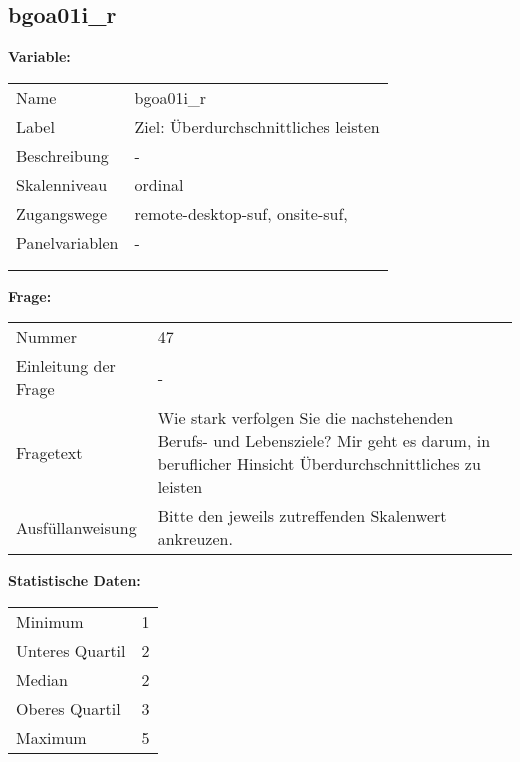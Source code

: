 	
	
	\subsection{bgoa01i\_r}
	\label{subSection:bgoa01i_r}

	\noindent\textbf{Variable:}\\
		\begin{tabular}{lL{11.3cm}}
			\label{tableVariable:bgoa01i_r}
			Name & bgoa01i\_r \\
			Label & Ziel: Überdurchschnittliches leisten \\
			Beschreibung & - \\
			Skalenniveau & ordinal \\
			Zugangswege &
				remote-desktop-suf,
				onsite-suf,
 \\
			Panelvariablen & -
			 \\
			 \\
 \\
		\end{tabular}

		\vspace*{1 cm}
		\noindent\textbf{Frage:}\\
		\begin{tabular}{lL{11.3cm}}
			\label{tableQuestion:bgoa01i_r}
			Nummer & 47 \\
			Einleitung der Frage & - \\
			Fragetext & Wie stark verfolgen Sie die nachstehenden Berufs- und Lebensziele?
Mir geht es darum, in beruflicher Hinsicht Überdurchschnittliches zu leisten \\
			Ausfüllanweisung & Bitte den jeweils zutreffenden Skalenwert ankreuzen. \\
		\end{tabular}


		\vspace*{1 cm}
		\noindent\textbf{Statistische Daten:}\\
			\begin{tabular}{ll}
				\label{tableStatistics:bgoa01i_r}
					Minimum & 1 \\
					Unteres Quartil & 2 \\
					Median & 2 \\
					Oberes Quartil & 3 \\
					Maximum & 5 \\
			\end{tabular}



